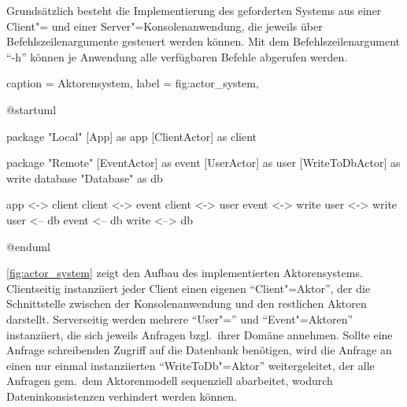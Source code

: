 Grundsätzlich besteht die Implementierung des geforderten Systems aus einer Client"= und einer Server"=Konsolenanwendung, die jeweils über Befehlszeilenargumente gesteuert werden können.
Mit dem Befehlszeilenargument \enquote{-h} können je Anwendung alle verfügbaren Befehle abgerufen werden.

\begin{dhbwfigure}{%
    caption	= Aktorensystem,
    label	= fig:actor_system,
}
\begin{plantuml}
@startuml

package "Local" {
    [App] as app
    [ClientActor] as client
}

package "Remote" {
    [EventActor] as event
    [UserActor] as user
    [WriteToDbActor] as write
    database "Database" as db
}

app <-> client
client <-> event
client <-> user
event <-> write
user <-> write
user <-- db
event <-- db
write <--> db

@enduml
\end{plantuml}
\end{dhbwfigure}

\autoref{fig:actor_system} zeigt den Aufbau des implementierten Aktorensystems.
Clientseitig instanziiert jeder Client einen eigenen \enquote{Client"=Aktor}, der die Schnittstelle zwischen der Konsolenanwendung und den restlichen Aktoren darstellt.
Serverseitig werden mehrere \enquote{User"=} und \enquote{Event"=Aktoren} instanziiert, die sich jeweils Anfragen bzgl.\ ihrer Domäne annehmen.
Sollte eine Anfrage schreibenden Zugriff auf die Datenbank benötigen, wird die Anfrage an einen nur einmal instanziierten \enquote{WriteToDb"=Aktor} weitergeleitet, der alle Anfragen gem.\ dem Aktorenmodell sequenziell abarbeitet, wodurch Dateninkonsistenzen verhindert werden können.
